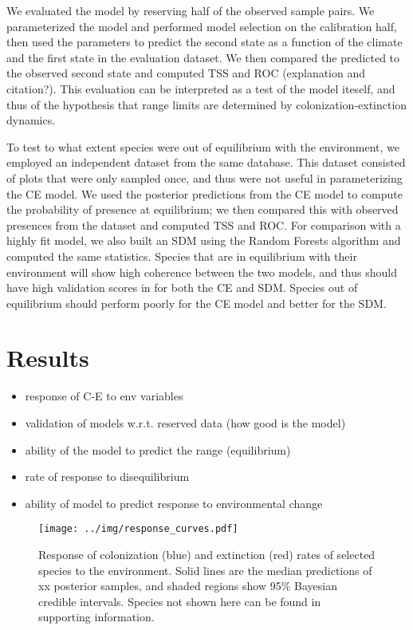 \documentclass[11pt]{article}
\begin{document}
We evaluated the model by reserving half of the observed sample pairs.
We parameterized the model and performed model selection on the calibration half, then used the parameters to predict the second state as a function of the climate and the first state in the evaluation dataset.
We then compared the predicted to the observed second state and computed TSS and ROC (explanation and citation?).
This evaluation can be interpreted as a test of the model iteself, and thus of the hypothesis that range limits are determined by colonization-extinction dynamics.

To test to what extent species were out of equilibrium with the environment, we employed an independent dataset from the same database.
This dataset consisted of plots that were only sampled once, and thus were not useful in parameterizing the CE model.
We used the posterior predictions from the CE model to compute the probability of presence at equilibrium; we then compared this with observed presences from the dataset and computed TSS and ROC.
For comparison with a highly fit model, we also built an SDM using the Random Forests algorithm and computed the same statistics.
Species that are in equilibrium with their environment will show high coherence between the two models, and thus should have high validation scores in for both the CE and SDM.
Species out of equilibrium should perform poorly for the CE model and better for the SDM.


\section*{Results}
\begin{itemize}
	\item response of C-E to env variables
	\item validation of models w.r.t. reserved data (how good is the model)
	\item ability of the model to predict the range (equilibrium)
	\item rate of response to disequilibrium
	\item ability of model to predict response to environmental change
\end{itemize}
\begin{figure}
	\texttt{[image: ../img/response\_curves.pdf]}
	\caption{
		Response of colonization (blue) and extinction (red) rates of selected species to the environment.
		Solid lines are the median predictions of xx posterior samples, and shaded regions show 95\% Bayesian credible intervals.
		Species not shown here can be found in supporting information.
	}
	\label{fig:response_curves}
\end{figure}
\end{document}
